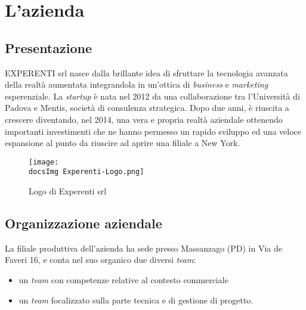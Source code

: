 \section{L'azienda}
\subsection{Presentazione}
EXPERENTI srl nasce dalla brillante idea di sfruttare la tecnologia avanzata della realt\`a aumentata integrandola in un'ottica di \textit{business\gloss} e \textit{marketing} esperenziale.
La \textit{startup} \`e nata nel 2012 da una collaborazione tra l’Università di Padova e Mentis, società di consulenza strategica. Dopo due anni, \`e riuscita a crescere diventando, nel 2014, una vera e propria realt\`a aziendale ottenendo importanti investimenti che ne hanno permesso un rapido sviluppo ed una veloce espansione al punto da riuscire ad aprire una filiale a New York.

\begin{figure}[H]
	\centering
	\texttt{[image: \\docsImg Experenti-Logo.png]}
	\caption{Logo di Experenti srl}
	\label{fig:Logo di Experenti srl}
\end{figure}

\subsection{Organizzazione aziendale}
La filiale produttiva dell’azienda ha sede presso Massanzago (PD) in Via de Faveri 16, e conta nel suo organico due diversi \textit{team}: 
\begin{itemize}
\item un \textit{team} con competenze relative al contesto commerciale
\item un \textit{team} focalizzato sulla parte tecnica e di gestione di progetto.
\end{itemize}

